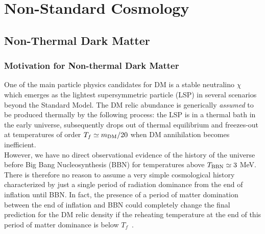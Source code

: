 \documentclass[12pt,a4paper]{book}
\begin{document}
\part{Non-Standard Cosmology}
\label{part:Cosmology}

\chapter{Non-Thermal Dark Matter}
\label{chap:NonThermalDM}

\section{Motivation for Non-thermal Dark Matter}
\label{sec:motivation}

One of the main particle physics candidates for DM is a stable neutralino $\chi$ which emerges as the lightest supersymmetric particle (LSP) in several scenarios beyond the Standard Model. The DM relic abundance is generically \emph{assumed} to be produced thermally by the following process: the LSP is in a thermal bath in the early universe, subsequently drops out of thermal equilibrium and freezes-out at temperatures of order
$T_f \simeq m_{\rm DM}/20$ when DM annihilation becomes inefficient.\\

However, we have no direct observational evidence of the history of the universe before Big Bang Nucleosynthesis (BBN) for temperatures above $T_{\rm BBN} \simeq 3$ MeV. There is therefore no reason to assume a very simple cosmological history characterized by just a single period of radiation dominance from the end of inflation until BBN. In fact, the presence of a period of matter domination between the end of inflation and BBN could completely change the final prediction for the DM relic density if the reheating temperature at the end of this period of matter dominance is below $T_f$~\cite{Barrow:1982ei, Kamionkowski:1990ni, Moroi:1999zb, Fujii:2001xp, Kitano:2008tk, Dutta:2009uf}.\\
\end{document}

